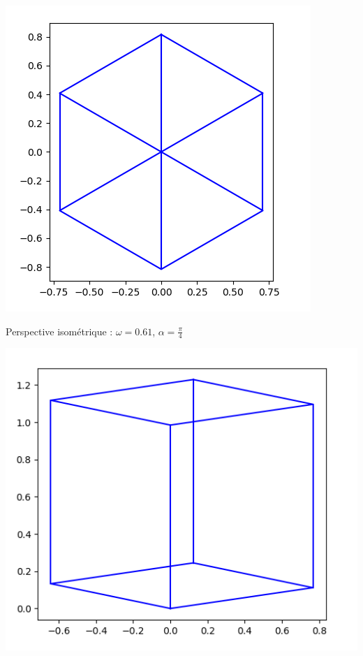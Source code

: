 \documentclass[11pt,class=report,crop=false]{standalone}
\begin{document}
\begin{activite}[Perspective]
\begin{enumerate}
	\begin{center}
	\begin{minipage}{0.45\textwidth}
	\begin{center}
		\includegraphics[scale=\myscale,scale=0.4]{ecran-perspective-4}
			
		Perspective isométrique : $\omega=0.61$, $\alpha=\frac\pi4$
	\end{center}
	\end{minipage}
	\begin{minipage}{0.45\textwidth}
	\begin{center}
		\includegraphics[scale=\myscale,scale=0.4]{ecran-perspective-5}
			

\end{center}
\end{minipage}
\end{center}
\end{enumerate}
\end{activite}
\end{document}
